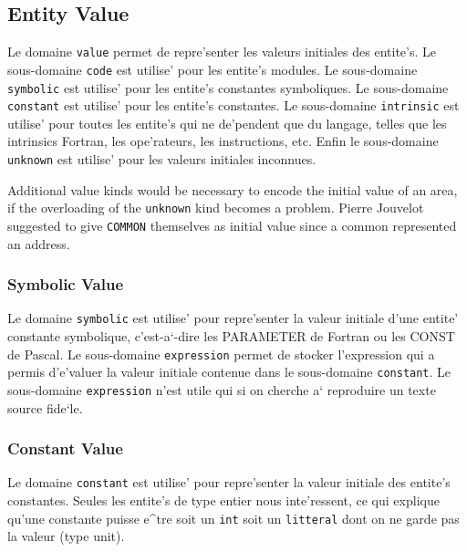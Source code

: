 \subsection{Entity Value}
\label{subsection-value}

{
Le domaine \verb/value/ permet de repre'senter les
valeurs initiales des entite's. Le sous-domaine \verb/code/ est utilise'
pour les entite's modules. Le sous-domaine \verb/symbolic/ est utilise'
pour les entite's constantes symboliques. Le sous-domaine
\verb/constant/ est utilise' pour les entite's constantes. Le
sous-domaine \verb/intrinsic/ est utilise' pour toutes les entite's qui
ne de'pendent que du langage, telles que les intrinsics Fortran, les
ope'rateurs, les instructions, etc. Enfin le sous-domaine
\verb/unknown/ est utilise' pour les valeurs initiales inconnues.

Additional value kinds would be necessary to encode the initial value of
an area, if the overloading of the \verb+unknown+ kind becomes a
problem. Pierre Jouvelot suggested to give \verb+COMMON+ themselves as
initial value since a common represented an address.
}

\subsubsection{Symbolic Value}
\label{subsubsection-symbolic}

{
Le domaine \verb/symbolic/ est utilise' pour repre'senter la valeur
initiale d'une entite' constante symbolique, c'est-a`-dire les PARAMETER
de Fortran ou les CONST de Pascal. Le sous-domaine \verb/expression/
permet de stocker l'expression qui a permis d'e'valuer la valeur
initiale contenue dans le sous-domaine \verb/constant/. Le sous-domaine
\verb/expression/ n'est utile qui si on cherche a` reproduire un texte
source fide`le.
}

\subsubsection{Constant Value}
\label{subsubsection-constant}

{
Le domaine \verb/constant/ est utilise' pour repre'senter la valeur
initiale des entite's constantes. Seules les entite's de type entier
nous inte'ressent, ce qui explique qu'une constante puisse e^tre soit un
\verb/int/ soit un \verb/litteral/ dont on ne garde pas la valeur (type unit).
}

